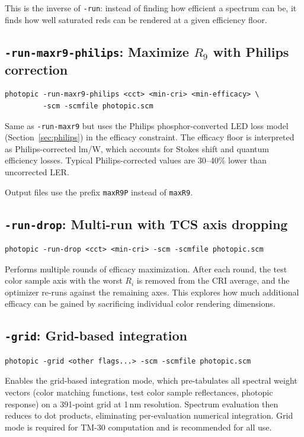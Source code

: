 \documentclass[11pt]{article}
\newcommand{\cmd}[1]{\texttt{#1}}
\begin{document}
This is the inverse of \cmd{-run}: instead of finding how efficient a
spectrum can be, it finds how well saturated reds can be rendered at a
given efficiency floor.

\subsection{\texttt{-run-maxr9-philips}: Maximize \texorpdfstring{$R_9$}{R9} with Philips correction}

\begin{lstlisting}[style=shell]
photopic -run-maxr9-philips <cct> <min-cri> <min-efficacy> \
         -scm -scmfile photopic.scm
\end{lstlisting}

Same as \cmd{-run-maxr9} but uses the Philips phosphor-converted LED
loss model (Section~\ref{sec:philips}) in the efficacy constraint.
The efficacy floor is interpreted as Philips-corrected lm/W, which
accounts for Stokes shift and quantum efficiency losses.  Typical
Philips-corrected values are 30--40\% lower than uncorrected LER.

Output files use the prefix \cmd{maxR9P} instead of \cmd{maxR9}.

\subsection{\texttt{-run-drop}: Multi-run with TCS axis dropping}

\begin{lstlisting}[style=shell]
photopic -run-drop <cct> <min-cri> -scm -scmfile photopic.scm
\end{lstlisting}

Performs multiple rounds of efficacy maximization.  After each round, the
test color sample axis with the worst $R_i$ is removed from the CRI
average, and the optimizer re-runs against the remaining axes.  This
explores how much additional efficacy can be gained by sacrificing
individual color rendering dimensions.

\subsection{\texttt{-grid}: Grid-based integration}

\begin{lstlisting}[style=shell]
photopic -grid <other flags...> -scm -scmfile photopic.scm
\end{lstlisting}

Enables the grid-based integration mode, which pre-tabulates all
spectral weight vectors (color matching functions, test color sample
reflectances, photopic response) on a 391-point grid at 1\,nm
resolution.  Spectrum evaluation then reduces to dot products,
eliminating per-evaluation numerical integration.  Grid mode is
required for TM-30 computation and is recommended for all use.
\end{document}
